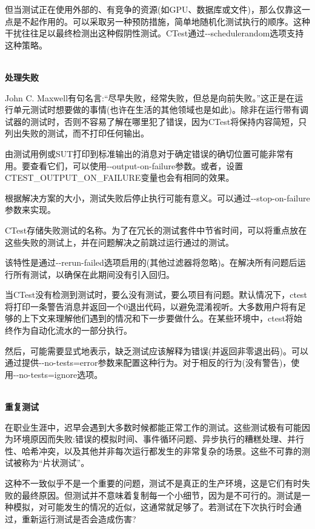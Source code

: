 但当测试正在使用外部的、有竞争的资源(如GPU、数据库或文件)，那么仅靠这一点是不起作用的。可以采取另一种预防措施，简单地随机化测试执行的顺序。这种干扰往往足以最终检测出这种假阴性测试。CTest通过-{}-schedulerandom选项支持这种策略。

\hspace*{\fill} \\ %
\noindent
\textbf{处理失败}

John C. Maxwell有句名言:“尽早失败，经常失败，但总是向前失败。”这正是在运行单元测试时想要做的事情(也许在生活的其他领域也是如此)。除非在运行带有调试器的测试时，否则不容易了解在哪里犯了错误，因为CTest将保持内容简短，只列出失败的测试，而不打印任何输出。

由测试用例或SUT打印到标准输出的消息对于确定错误的确切位置可能非常有用。要查看它们，可以使用-{}-output-on-failure参数。或者，设置CTEST\_OUTPUT\_ON\_FAILURE变量也会有相同的效果。

根据解决方案的大小，测试失败后停止执行可能有意义。可以通过-{}-stop-on-failure参数来实现。

CTest存储失败测试的名称。为了在冗长的测试套件中节省时间，可以将重点放在这些失败的测试上，并在问题解决之前跳过运行通过的测试。

该特性是通过-{}-rerun-failed选项启用的(其他过滤器将忽略)。在解决所有问题后运行所有测试，以确保在此期间没有引入回归。

当CTest没有检测到测试时，要么没有测试，要么项目有问题。默认情况下，ctest将打印一条警告消息并返回一个0退出代码，以避免混淆视听。大多数用户将有足够的上下文来理解他们遇到的情况和下一步要做什么。在某些环境中，ctest将始终作为自动化流水的一部分执行。

然后，可能需要显式地表示，缺乏测试应该解释为错误(并返回非零退出码)。可以通过提供-{}-no-tests=error参数来配置这种行为。对于相反的行为(没有警告)，使用-{}-no-tests=ignore选项。

\hspace*{\fill} \\ %
\noindent
\textbf{重复测试}

在职业生涯中，迟早会遇到大多数时候都能正常工作的测试。这些测试极有可能因为环境原因而失败:错误的模拟时间、事件循环问题、异步执行的糟糕处理、并行性、哈希冲突，以及其他并非每次运行都发生的非常复杂的场景。这些不可靠的测试被称为“片状测试”。

这种不一致似乎不是一个重要的问题，测试不是真正的生产环境，这是它们有时失败的最终原因。但测试并不意味着复制每一个小细节，因为是不可行的。测试是一种模拟，对可能发生的情况的近似，这通常就足够了。若测试在下次执行时会通过，重新运行测试是否会造成伤害?

